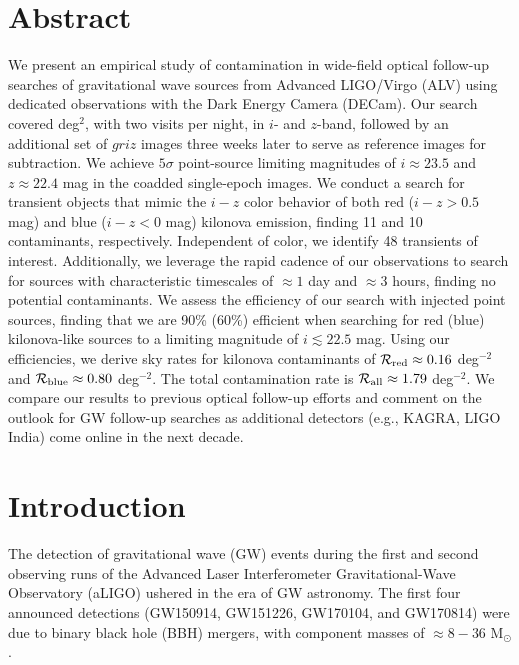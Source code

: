 
\section*{Abstract}
We present an empirical study of contamination in wide-field optical follow-up searches of gravitational wave sources from Advanced LIGO/Virgo (ALV) using dedicated observations with the Dark Energy Camera (DECam). Our search covered  deg$^2$, with two visits per night, in $i$- and $z$-band, followed by an additional set of $griz$ images three weeks later to serve as reference images for subtraction. We achieve $5\sigma$ point-source limiting magnitudes of $i \approx 23.5$ and $z \approx 22.4$ mag in the coadded single-epoch images. We conduct a search for transient objects that mimic the $i-z$ color behavior of both red ($i-z > 0.5$ mag) and blue ($i-z < 0$ mag) kilonova emission, finding 11 and 10 contaminants, respectively. Independent of color, we identify 48 transients of interest. Additionally, we leverage the rapid cadence of our observations to search for sources with characteristic timescales of $\approx1$ day and $\approx3$ hours, finding no potential contaminants. We assess the efficiency of our search with injected point sources, finding that we are 90\% (60\%) efficient when searching for red (blue) kilonova-like sources to a limiting magnitude of $i \lesssim 22.5$ mag. Using our efficiencies, we derive sky rates for kilonova contaminants of $\mathcal{R}_{\rm red} \approx 0.16$ deg$^{-2}$ and $\mathcal{R}_{\rm blue} \approx 0.80$ deg$^{-2}$. The total contamination rate is $\mathcal{R}_{\rm all} \approx 1.79$ deg$^{-2}$. We compare our results to previous optical follow-up efforts and comment on the outlook for GW follow-up searches as additional detectors (e.g., KAGRA, LIGO India) come online in the next decade.

\section{Introduction}
\label{sec:intro}
The detection of gravitational wave (GW) events during the first and second observing runs of the Advanced Laser Interferometer Gravitational-Wave Observatory (aLIGO) ushered in the era of GW astronomy. The first four announced detections (GW150914, GW151226, GW170104, and GW170814) were due to binary black hole (BBH) mergers, with component masses of $\approx8-36$ M$_\odot$ \citep{gw150914,gw151226,gw170104,gw170814}. 

